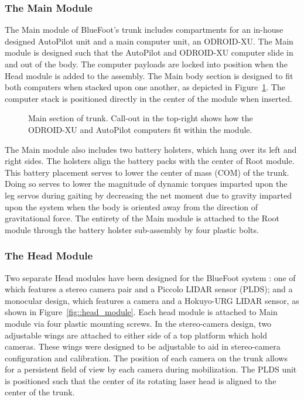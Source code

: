 			\subsubsection{The Main Module}
		
				The Main module of BlueFoot's trunk includes compartments for an in-house designed AutoPilot unit and a main computer unit, an ODROID-XU. The Main module is designed such that the AutoPilot and ODROID-XU computer slide in and out of the body. The computer payloads are locked into position when the Head module is added to the assembly. The Main body section is designed to fit both computers when stacked upon one another, as depicted in Figure~\ref{fig::main_module}. The computer stack is positioned directly in the center of the module when inserted.
%
				\begin{figure}[h!]
					\centering
					\caption{Main section of trunk. Call-out in the top-right shows how the ODROID-XU and AutoPilot computers fit within the module.}
					\label{fig::main_module}
				\end{figure}

			
				The Main module also includes two battery holsters, which hang over its left and right sides. The holsters align the battery packs with the center of Root module. This battery placement serves to lower the center of mass (COM) of the trunk. Doing so serves to lower the magnitude of dynamic torques imparted upon the leg servos during gaiting by decreasing the net moment due to gravity imparted upon the system when the body is oriented away from the direction of gravitational force. The entirety of the Main module is attached to the Root module through the battery holster sub-assembly by four plastic bolts.
		
			\subsubsection{The Head Module}

				Two separate Head modules have been designed for the BlueFoot system : one of which features a stereo camera pair and a Piccolo LIDAR sensor (PLDS); and a monocular design, which features a camera and a Hokuyo-URG LIDAR sensor, as shown in Figure~\ref{fig::head_module}. Each head module is attached to Main module via four plastic mounting screws. In the stereo-camera design, two adjustable wings are attached to either side of a top platform which hold cameras. These wings were designed to be adjustable to aid in stereo-camera configuration and calibration. The position of each camera on the trunk allows for a persistent field of view by each camera during mobilization. The PLDS unit is positioned such that the center of its rotating laser head is aligned to the center of the trunk. 

